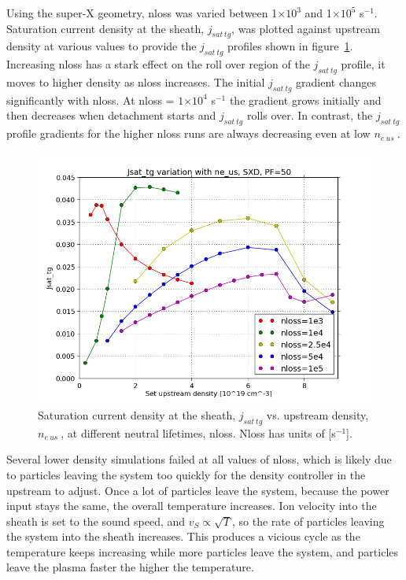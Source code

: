 \documentclass[11pt]{article}  %
\providecommand{\e}[1]{\ensuremath{\times 10^{#1}}} %
\providecommand{\pow}[1]{{$^{#1}$}} %
\providecommand{\neus}{$n_{e~us}~$} %
\begin{document}
Using the super-X geometry, nloss was varied between 1\e{3} and 1\e{5} s\pow{-1}. Saturation current density at the sheath, $j_{sat~tg}$, was plotted against upstream density at various values to provide the $j_{sat~tg}$ profiles shown in figure~\ref{fignloss1e345,52.5e425_2}. Increasing nloss has a stark effect on the roll over region of the $j_{sat~tg}$ profile, it moves to higher density as nloss increases. The initial $j_{sat~tg}$ gradient changes significantly with nloss. At nloss = $1\e{4}$ s\pow{-1} the gradient grows initially and then decreases when detachment starts and $j_{sat~tg}$ rolls over. In contrast, the $j_{sat~tg}$ profile gradients for the higher nloss runs are always decreasing even at low \neus. 

\begin{figure}
\includegraphics[scale=0.5]{Figures/sol1d/nloss1e345,525e425_2.png}
\centering
\caption{Saturation current density at the sheath, $j_{sat~tg}$ vs. upstream density, \neus, at different neutral lifetimes, nloss. Nloss has units of [s\pow{-1}].}\label{fignloss1e345,52.5e425_2}
\end{figure}


Several lower density simulations failed at all values of nloss, which is likely due to particles leaving the system too quickly for the density controller in the upstream to adjust. Once a lot of particles leave the system, because the power input stays the same, the overall temperature increases. Ion velocity into the sheath is set to the sound speed, and $v_S \propto \sqrt{T}$, so the rate of particles leaving the system into the sheath increases. This produces a vicious cycle as the temperature keeps increasing while more particles leave the system, and particles leave the plasma faster the higher the temperature.
\end{document}

